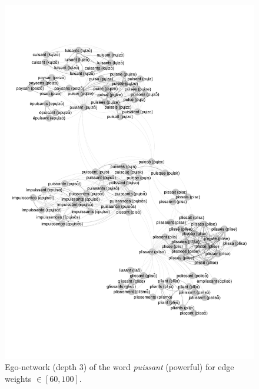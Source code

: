 \begin{figure}[H]
    \centering
    \includegraphics[width=\linewidth, trim=1cm 3.4cm 0.5cm 3.2cm, clip]{assets/puissant-ego.pdf}
    \caption{Ego-network (depth 3) of the word \textit{puissant} (powerful) for edge weights $\in [60, 100]$.}
    \label{fig:puissant-ego}
\end{figure}

